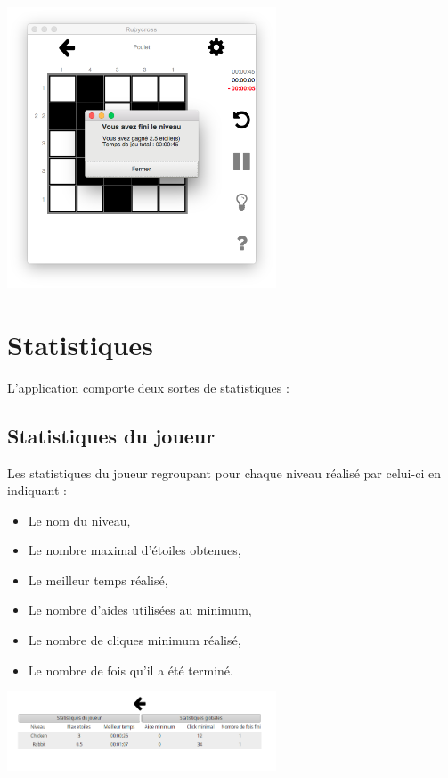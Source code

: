 \documentclass[a4paper, 12pt]{report}
\begin{document}
            \begin{minipage}{\linewidth}
                    \centering
			        \includegraphics[width=8cm]{imageGrilleFin.png}
	        \end{minipage}       
            
	
	\section{Statistiques}

		L'application comporte deux sortes de statistiques : 
		
		\subsection{Statistiques du joueur}
		
		    Les statistiques du joueur regroupant pour chaque niveau réalisé par celui-ci en indiquant :
		    \begin{itemize}
                    \item Le nom du niveau,
                    \item Le nombre maximal d'étoiles obtenues,
                    \item Le meilleur temps réalisé,
                    \item Le nombre d'aides utilisées au minimum,
                    \item Le nombre de cliques minimum réalisé,
                    \item Le nombre de fois qu'il a été terminé.
            \end{itemize}
		    
		    \begin{minipage}{\linewidth}
                    \centering
			        \includegraphics[width=8cm]{StatsJoueur.png}
	        \end{minipage}
		
\end{document}
